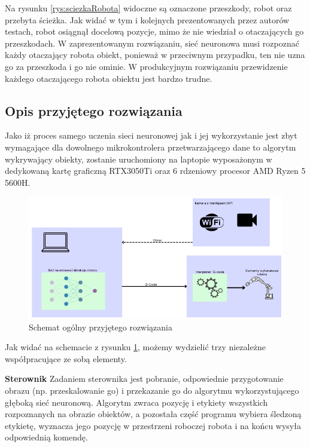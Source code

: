 Na rysunku \ref{rys:sciezkaRobota} widoczne są oznaczone przeszkody, robot oraz przebyta ścieżka. Jak widać w tym i kolejnych prezentowanych przez autorów testach, robot osiągnął docelową pozycje, mimo że nie wiedział o otaczających go przeszkodach. W zaprezentowanym rozwiązaniu, sieć neuronowa musi rozpoznać każdy otaczający robota obiekt, ponieważ w przeciwnym przypadku, ten nie uzna go za przeszkoda i go nie ominie.
W produkcyjnym rozwiązaniu przewidzenie każdego otaczającego robota obiektu jest bardzo trudne.



\subsection{Opis przyjętego rozwiązania}
Jako iż proces samego uczenia sieci neuronowej jak i jej wykorzystanie jest zbyt wymagające dla dowolnego mikrokontrolera przetwarzającego dane to algorytm wykrywający obiekty,
zostanie uruchomiony na laptopie wyposażonym w dedykowaną kartę graficzną RTX3050Ti oraz 6 rdzeniowy procesor AMD Ryzen 5 5600H. 

\begin{figure}[H]
	\centering
	\includegraphics[width=14cm]{pages/OpisRozwiazania/img/SchematOgolny.png}
	\caption{Schemat ogólny przyjętego rozwiązania}
	\label{sch:schematOgolny}
\end{figure}
Jak widać na schemacie z rysunku \ref{sch:schematOgolny}, możemy wydzielić trzy niezależne współpracujące ze sobą elementy.

\textbf{Sterownik} \newline
Zadaniem sterownika jest pobranie, odpowiednie przygotowanie obrazu (np. przeskalowanie go) i przekazanie go do algorytmu wykorzystującego głęboką sieć neuronową. 
Algorytm zwraca pozycję i etykiety wszystkich rozpoznanych na obrazie obiektów, a pozostała część programu wybiera śledzoną etykietę, wyznacza jego pozycję w przestrzeni
roboczej robota i na końcu wysyła odpowiednią komendę.



